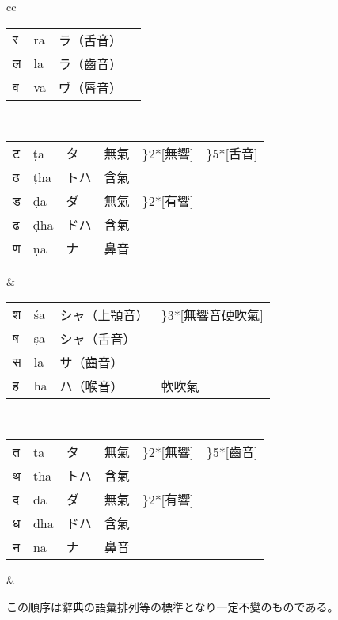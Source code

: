 \begin{tabular}{cc}
\begin{minipage}{0.46\hsize}
\begin{tabular}{llll}
  {\dnf र} & ra & ラ（舌音） & \\
  {\dnf ल} & la & ラ（齒音） & \\
  {\dnf व} & va & ヷ（唇音） &
  \end{tabular}
  \end{minipage}
  \\
  \begin{minipage}{0.46\hsize}
  \begin{tabular}{llp{}lll}
  {\dnf ट} & ṭa & タ & 無氣 & \rdelim\}{2}{*}[\parbox{1\zw}{無響}] & \rdelim\}{5}{*}[舌音] \\
  {\dnf ठ} & ṭha & トハ & 含氣 & & \\
  {\dnf ड} & ḍa & ダ & 無氣 & \rdelim\}{2}{*}[\parbox{1\zw}{有響}] & \\
  {\dnf ढ} & ḍha & ドハ & 含氣 & & \\
  {\dnf ण} & ṇa & ナ & 鼻音 &
  \end{tabular}
  \end{minipage}
  &
  \begin{minipage}{0.46\hsize}
  \begin{tabular}{llll}
  {\dnf श} & śa & シャ（上顎音） & \rdelim\}{3}{*}[\parbox{3\zw}{無響音硬吹氣}] \\
  {\dnf ष} & ṣa & シャ（舌音） & \\
  {\dnf स} & la & サ（齒音） & \\
  {\dnf ह} & ha & ハ（喉音） & 軟吹氣
  \end{tabular}
  \end{minipage}
  \\
  \begin{minipage}{0.46\hsize}
  \begin{tabular}{llp{}lll}
  {\dnf त} & ta & タ & 無氣 & \rdelim\}{2}{*}[\parbox{1\zw}{無響}] & \rdelim\}{5}{*}[齒音] \\
  {\dnf थ} & tha & トハ & 含氣 & & \\
  {\dnf द} & da & ダ & 無氣 & \rdelim\}{2}{*}[\parbox{1\zw}{有響}] & \\
  {\dnf ध} & dha & ドハ & 含氣 & & \\
  {\dnf न} & na & ナ & 鼻音 &
  \end{tabular}
  \end{minipage}
  &
\end{tabular}

この順序は辭典の語彙排列等の標準となり一定不變のものである。

